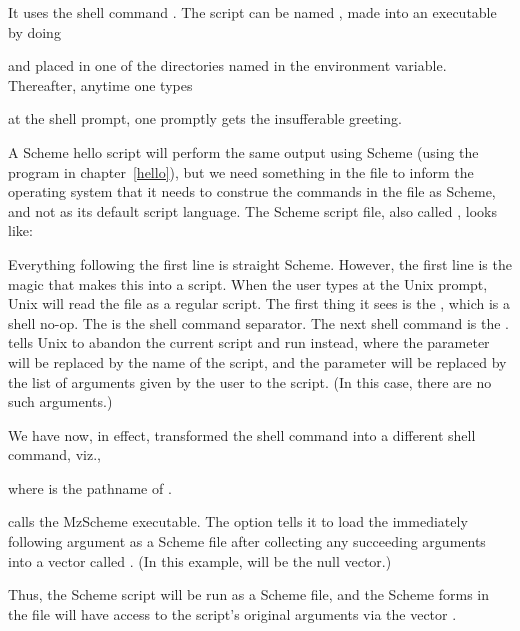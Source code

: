 
\n It uses the shell command .  The script can be
named , made into an executable by doing


\n and placed in one of
the directories named in the  environment
variable.  Thereafter, anytime one types


\n at the shell  prompt, one promptly gets the
insufferable greeting.

A Scheme hello script will perform the same output
using Scheme (using the program in chapter~\ref{hello}),
but we need something in the file to inform the
operating system that it needs to construe the commands
in the file as Scheme, and not as its default script
language.  The Scheme script file, also called
, looks like:


\n Everything following the first line is straight
Scheme.  However, the first line is the magic that
makes this into a script.  When the user types
 at the Unix prompt, Unix will read the file
as a regular script.  The first thing it sees is the
, which is a shell no-op.  The \p{;} is the shell
command separator.  The next shell command is the
.   tells Unix to abandon  the
current script and run  instead,
where the parameter  will be replaced by the name
of the script, and the parameter  will be
replaced by the list of arguments given by the user to
the script.  (In this case, there are no such
arguments.)

We have now, in effect, transformed the  shell
command into a different shell command, viz.,


\n where  is the pathname of .

 calls the MzScheme executable.  The 
option tells it to load the immediately following
argument as a Scheme file after collecting any
succeeding arguments into a vector called .
(In this example,  will be the null vector.)

Thus, the Scheme script will be run as a Scheme file,
and the Scheme forms in the file will have access to
the script’s original arguments via the vector
.

